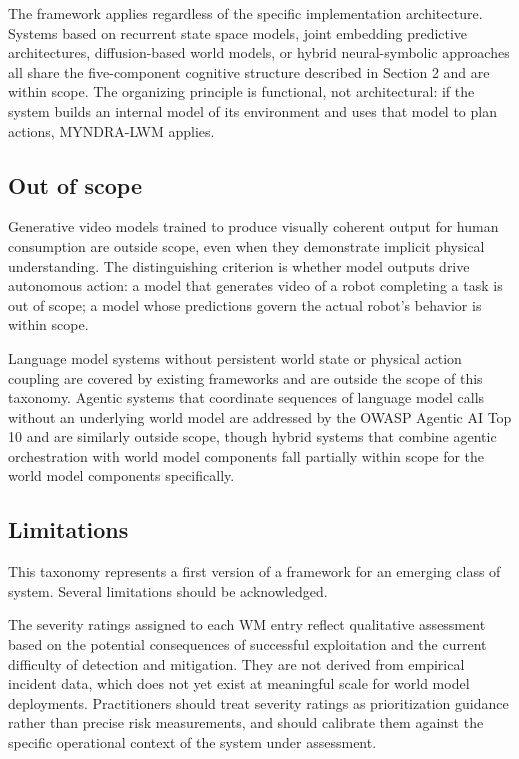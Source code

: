 \documentclass[11pt,a4paper]{article}
\begin{document}
The framework applies regardless of the specific implementation architecture. Systems based on recurrent state space models, joint embedding predictive architectures, diffusion-based world models, or hybrid neural-symbolic approaches all share the five-component cognitive structure described in Section 2 and are within scope. The organizing principle is functional, not architectural: if the system builds an internal model of its environment and uses that model to plan actions, MYNDRA-LWM applies.

\subsection{Out of scope}

Generative video models trained to produce visually coherent output for human consumption are outside scope, even when they demonstrate implicit physical understanding. The distinguishing criterion is whether model outputs drive autonomous action: a model that generates video of a robot completing a task is out of scope; a model whose predictions govern the actual robot's behavior is within scope.

Language model systems without persistent world state or physical action coupling are covered by existing frameworks and are outside the scope of this taxonomy. Agentic systems that coordinate sequences of language model calls without an underlying world model are addressed by the OWASP Agentic AI Top 10 and are similarly outside scope, though hybrid systems that combine agentic orchestration with world model components fall partially within scope for the world model components specifically.

\subsection{Limitations}

This taxonomy represents a first version of a framework for an emerging class of system. Several limitations should be acknowledged.

The severity ratings assigned to each WM entry reflect qualitative assessment based on the potential consequences of successful exploitation and the current difficulty of detection and mitigation. They are not derived from empirical incident data, which does not yet exist at meaningful scale for world model deployments. Practitioners should treat severity ratings as prioritization guidance rather than precise risk measurements, and should calibrate them against the specific operational context of the system under assessment.
\end{document}
